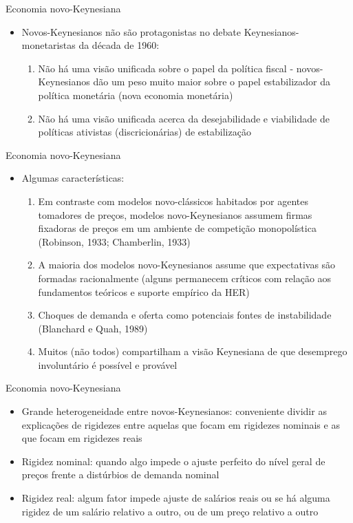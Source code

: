 \documentclass[10pt]{beamer}
\begin{document}
\begin{frame}{Economia novo-Keynesiana}
    \begin{itemize}
        \item Novos-Keynesianos não são protagonistas no debate Keynesianos-monetaristas da década de 1960:\bigskip
        \begin{enumerate}
            \item Não há uma visão unificada sobre o papel da política fiscal - novos-Keynesianos dão um peso muito maior sobre o papel estabilizador da política monetária (nova economia monetária)\bigskip
            \item Não há uma visão unificada acerca da desejabilidade e viabilidade de políticas ativistas (discricionárias) de estabilização
        \end{enumerate}
    \end{itemize}
\end{frame}

\begin{frame}{Economia novo-Keynesiana}
    \begin{itemize}
        \item Algumas características:\bigskip
        \begin{enumerate}
            \item Em contraste com modelos novo-clássicos habitados por agentes tomadores de preços, modelos novo-Keynesianos assumem firmas fixadoras de preços em um ambiente de competição monopolística (Robinson, 1933; Chamberlin, 1933)\bigskip
            \item A maioria dos modelos novo-Keynesianos assume que expectativas são formadas racionalmente (alguns permanecem críticos com relação aos fundamentos teóricos e suporte empírico da HER)\bigskip
            \item Choques de demanda e oferta como potenciais fontes de instabilidade (Blanchard e Quah, 1989)\bigskip
            \item Muitos (não todos) compartilham a visão Keynesiana de que desemprego involuntário é possível e provável\bigskip
        \end{enumerate}
    \end{itemize}
\end{frame}

\begin{frame}{Economia novo-Keynesiana}
    \begin{itemize}
        \item Grande heterogeneidade entre novos-Keynesianos: conveniente dividir as explicações de rigidezes entre aquelas que focam em rigidezes nominais e as que focam em rigidezes reais\bigskip
        \item Rigidez nominal: quando algo impede o ajuste perfeito do nível geral de preços frente a distúrbios de demanda nominal\bigskip
        \item Rigidez real: algum fator impede ajuste de salários reais ou se há alguma rigidez de um salário relativo a outro, ou de um preço relativo a outro
    \end{itemize}
\end{frame}
\end{document}
